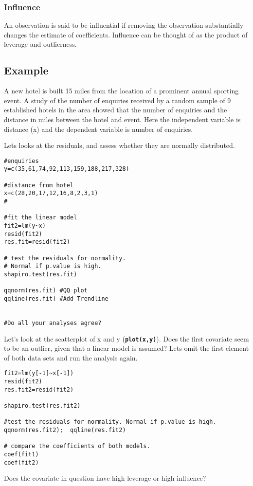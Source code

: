\subsubsection{Influence} An observation is said to be influential if removing the observation substantially changes the estimate of coefficients.  Influence can be thought of as the product of leverage and outlierness.
\subsection{Example}
A new hotel is built 15 miles from the location of a prominent annual sporting event. A study of the number of enquiries received by a random sample of 9 established hotels in the area showed that the number of enquiries and the distance in miles between the hotel and event. Here the independent variable is distance (x) and the dependent variable is number of enquiries.

Lets looks at the residuals, and assess whether they are normally distributed.

\begin{framed}
\begin{verbatim}
#enquiries
y=c(35,61,74,92,113,159,188,217,328)
 	
#distance from hotel
x=c(28,20,17,12,16,8,2,3,1)	
#

#fit the linear model	
fit2=lm(y~x)					
resid(fit2)
res.fit=resid(fit2)

# test the residuals for normality.
# Normal if p.value is high.
shapiro.test(res.fit)	
	
qqnorm(res.fit)	#QQ plot
qqline(res.fit)	#Add Trendline


#Do all your analyses agree?

\end{verbatim}
\end{framed}
Let’s look at the scatterplot of x and y (\textbf{\texttt{plot(x,y)}}).  Does the first covariate seem to be an outlier, given that a linear model is assumed?
Lets omit the first element of both data sets and run the analysis again.

\begin{framed}
\begin{verbatim}
fit2=lm(y[-1]~x[-1])
resid(fit2)
res.fit2=resid(fit2)

shapiro.test(res.fit2)			

#test the residuals for normality. Normal if p.value is high.
qqnorm(res.fit2);  qqline(res.fit2)			

# compare the coefficients of both models.
coef(fit1)
coef(fit2)

\end{verbatim}
\end{framed}
Does the covariate in question have high leverage or high influence?


